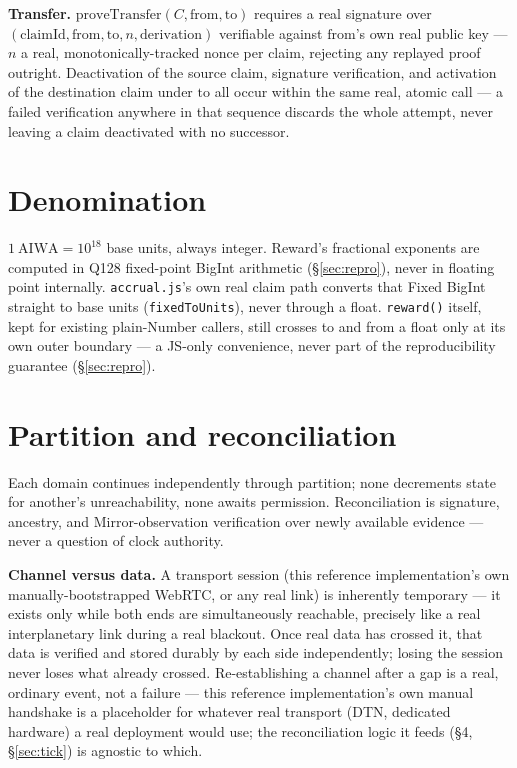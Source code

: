 \documentclass[10pt]{article}
\newcommand{\code}[1]{\texttt{\small #1}}
\begin{document}
\textbf{Transfer.} $\mathrm{proveTransfer}(C, \mathrm{from}, \mathrm{to})$ requires a real signature over $(\mathrm{claimId}, \mathrm{from}, \mathrm{to}, n, \mathrm{derivation})$ verifiable against $\mathrm{from}$'s own real public key --- $n$ a real, monotonically-tracked nonce per claim, rejecting any replayed proof outright. Deactivation of the source claim, signature verification, and activation of the destination claim under $\mathrm{to}$ all occur within the same real, atomic call --- a failed verification anywhere in that sequence discards the whole attempt, never leaving a claim deactivated with no successor.

\section{Denomination}

$1\ \mathrm{AIWA} = 10^{18}$ base units, always integer. Reward's fractional exponents are computed in Q128 fixed-point BigInt arithmetic (\S\ref{sec:repro}), never in floating point internally. \code{accrual.js}'s own real claim path converts that Fixed BigInt straight to base units (\code{fixedToUnits}), never through a float. \code{reward()} itself, kept for existing plain-Number callers, still crosses to and from a float only at its own outer boundary --- a JS-only convenience, never part of the reproducibility guarantee (\S\ref{sec:repro}).

\section{Partition and reconciliation}
\label{sec:partition}

Each domain continues independently through partition; none decrements state for another's unreachability, none awaits permission. Reconciliation is signature, ancestry, and Mirror-observation verification over newly available evidence --- never a question of clock authority.

\textbf{Channel versus data.} A transport session (this reference implementation's own manually-bootstrapped WebRTC, or any real link) is inherently temporary --- it exists only while both ends are simultaneously reachable, precisely like a real interplanetary link during a real blackout. Once real data has crossed it, that data is verified and stored durably by each side independently; losing the session never loses what already crossed. Re-establishing a channel after a gap is a real, ordinary event, not a failure --- this reference implementation's own manual handshake is a placeholder for whatever real transport (DTN, dedicated hardware) a real deployment would use; the reconciliation logic it feeds (\S4, \S\ref{sec:tick}) is agnostic to which.
\end{document}
